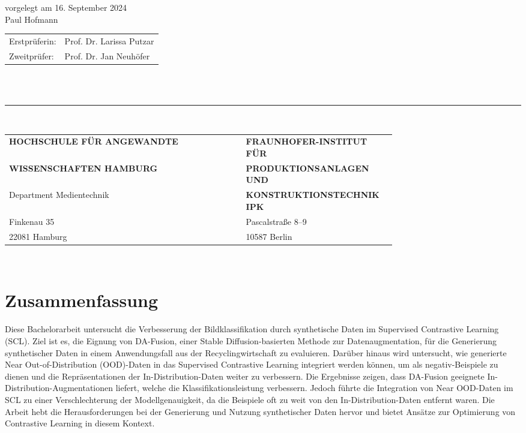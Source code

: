 \begin{titlepage}
  vorgelegt am 16. September 2024\\
  Paul Hofmann

  \vspace{3cm}

  \hspace*{37mm}
  \begin{minipage}{0.5\linewidth}
    \begin{tabular}{@{}ll}
      Erstprüferin: & Prof. Dr. Larissa Putzar\\[-.3mm]
      Zweitprüfer: & Prof. Dr. Jan Neuhöfer \\
    \end{tabular}\\
	
    \,\rule{9mm}{1mm}\\[1.5mm]
	
	\begin{tabular}{@{} p{0.75\linewidth} ll} %
    \textbf{HOCHSCHULE FÜR ANGEWANDTE} & \textbf{FRAUNHOFER-INSTITUT FÜR}\\
    \textbf{WISSENSCHAFTEN HAMBURG} & \textbf{PRODUKTIONSANLAGEN UND}\\
    Department Medientechnik & \textbf{KONSTRUKTIONSTECHNIK IPK}\\
    Finkenau 35 & Pascalstraße 8–9\\
    22081 Hamburg & 10587 Berlin
	\end{tabular}\\
  \end{minipage}
\end{titlepage}
\restoregeometry

\thispagestyle{empty}

\section*{Zusammenfassung}

Diese Bachelorarbeit untersucht die Verbesserung der Bildklassifikation durch synthetische Daten im Supervised Contrastive Learning (SCL). Ziel ist es, die Eignung von DA-Fusion, einer Stable Diffusion-basierten Methode zur Datenaugmentation, für die Generierung synthetischer Daten in einem Anwendungsfall aus der Recyclingwirtschaft zu evaluieren. Darüber hinaus wird untersucht, wie generierte Near Out-of-Distribution (OOD)-Daten in das Supervised Contrastive Learning integriert werden können, um als negativ-Beispiele zu dienen und die Repräsentationen der In-Distribution-Daten weiter zu verbessern. Die Ergebnisse zeigen, dass DA-Fusion geeignete In-Distribution-Augmentationen liefert, welche die Klassifikationsleistung verbessern. Jedoch führte die Integration von Near OOD-Daten im SCL zu einer Verschlechterung der Modellgenauigkeit, da die Beispiele oft zu weit von den In-Distribution-Daten entfernt waren. Die Arbeit hebt die Herausforderungen bei der Generierung und Nutzung synthetischer Daten hervor und bietet Ansätze zur Optimierung von Contrastive Learning in diesem Kontext.

